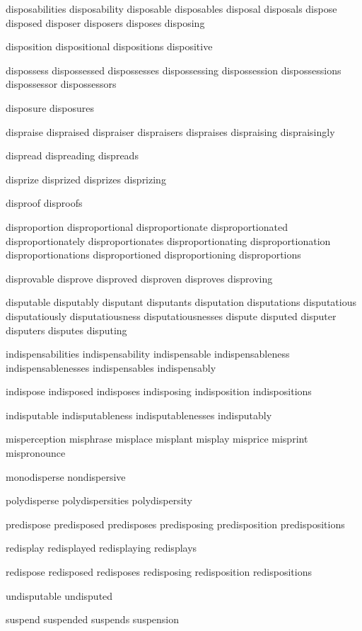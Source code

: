 \begin{itemize}
disposabilities disposability disposable disposables disposal disposals dispose disposed disposer disposers disposes disposing

disposition dispositional dispositions dispositive

dispossess dispossessed dispossesses dispossessing dispossession dispossessions dispossessor dispossessors

disposure disposures

dispraise dispraised dispraiser dispraisers dispraises dispraising dispraisingly

dispread dispreading dispreads

disprize disprized disprizes disprizing

disproof disproofs

disproportion disproportional disproportionate disproportionated disproportionately disproportionates disproportionating disproportionation disproportionations disproportioned disproportioning disproportions

disprovable disprove disproved disproven disproves disproving

disputable disputably disputant disputants disputation disputations disputatious disputatiously disputatiousness disputatiousnesses dispute disputed disputer disputers disputes disputing

indispensabilities indispensability indispensable indispensableness indispensablenesses indispensables indispensably

indispose indisposed indisposes indisposing indisposition indispositions

indisputable indisputableness indisputablenesses indisputably

misperception misphrase misplace misplant misplay misprice misprint mispronounce 

monodisperse nondispersive

polydisperse polydispersities polydispersity

predispose predisposed predisposes predisposing predisposition predispositions

redisplay redisplayed redisplaying redisplays

redispose redisposed redisposes redisposing redisposition redispositions

undisputable undisputed

suspend suspended suspends suspension


\end{itemize}



